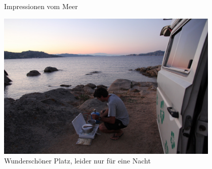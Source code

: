 \begin{figure}[H]
   \centering
   \quad
   \quad
   \quad
   \caption[Impressionen vom Mee]{Impressionen vom Meer}
\end{figure}

\begin{figure}[hb]
    \centering
    \includegraphics[width=0.95\textwidth]{../Bilder/Sardinien/23.jpg}
    \caption{Wunderschöner Platz, leider nur für eine Nacht}
    \label{img:Sardinien2}
\end{figure}

\newpage

